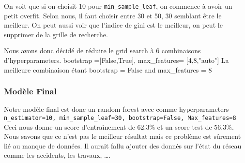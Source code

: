 On voit que si on choisit 10 pour \lstinline!min_sample_leaf!, on commence à avoir un petit overfit. Selon nous, il faut choisir entre 30 et 50, 30 semblant être le meilleur. On peut aussi voir que l'indice de gini est le meilleur, on peut le supprimer de la grille de recherche.

Nous avons donc décidé de réduire le grid search à 6 combinaisons d'hyperparameters.\newline
bootstrap =[False,True], max\_features= [4,8,"auto"]\newline
La meilleure combinaison étant bootstrap = False and max\_features = 8

\subsubsection{Modèle Final}
Notre modèle final est donc un random forest avec comme hyperparameters \lstinline!n_estimator=10, min_sample_leaf=30, bootstrap=False, Max_features=8! Ceci nous donne un score d'entraînement de 62.3\% et un score test de 56.3\%. \newline
Nous savons que ce n'est pas le meilleur résultat mais ce problème est sûrement lié au manque de données. Il aurait fallu ajouter des donnés sur l'état du réseau comme les accidents, les travaux, \dots.
